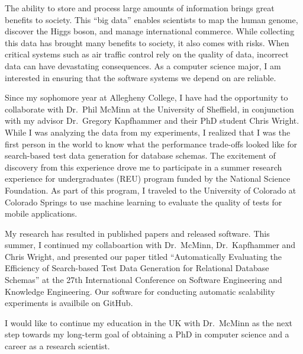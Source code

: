 \documentclass[11pt,a4paper,sans]{moderncv}        %
\begin{document}
\date{December 10, 2015}
\makelettertitle

The ability to store and process large amounts of information brings
great benefits to society.  This ``big data'' enables scientists to map
the human genome, discover the Higgs boson, and manage international
commerce.   While collecting this data has brought many benefits to
society, it also comes with risks.  When critical systems such as air
traffic control rely on the quality of data, incorrect data can have
devastating consequences. As a computer science major, I am interested in ensuring that the
software systems we depend on are reliable.

Since my sophomore year at Allegheny College, I have had the opportunity
to collaborate with Dr.\ Phil McMinn at the University of Sheffield, in
conjunction with my advisor Dr.\ Gregory Kapfhammer and their PhD student Chris Wright.
While I was analyzing the data from my experiments, I realized that I
was the first person in the world to know what the performance
trade-offs looked like for search-based test data generation for
database schemas. The excitement of discovery from this experience drove me to participate in a summer research experience for undergraduates (REU) program funded by the National Science Foundation. As part of this program, I traveled to the University of Colorado at Colorado Springs to use machine learning to evaluate the quality of tests for mobile applications. 

My research has resulted in published papers and released software. This
summer, I continued my collaboartion with  Dr.\ McMinn, Dr.\ Kapfhammer
and Chris Wright, and presented our paper titled “Automatically
Evaluating the Efficiency of Search-based Test Data Generation for
Relational Database Schemas” at the 27th International Conference on
Software Engineering and Knowledge Engineering. Our software for
conducting automatic scalability experiments is availbile on GitHub.



I would like to continue my education in the UK with Dr.\ McMinn as the next step towards my long-term goal of obtaining a PhD in computer science and a career as a research scientist. 

\makeletterclosing

\end{document}
